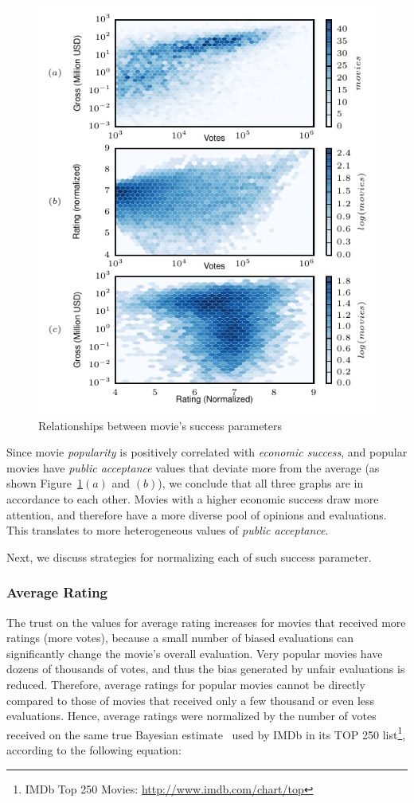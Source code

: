 \begin{figure}[tb]\begin{center} %
\includegraphics[width=0.85\columnwidth]{../../images/scatter_success_params.pdf}
\caption{\label{fig:scatter_success_params}Relationships between movie's
success parameters}
\end{center}\end{figure}

Since movie \textit{popularity} is positively correlated with \textit{economic
success}, and popular movies have \textit{public acceptance} values that
deviate more from the average (as shown
Figure~\ref{fig:scatter_success_params}$(a)$ and $(b)$), we conclude that all
three graphs are in accordance to each other. Movies with a higher economic
success draw more attention, and therefore have a more diverse pool of opinions
and evaluations. This translates to more heterogeneous values of \textit{public
acceptance}.

Next, we discuss strategies for normalizing each of such success parameter.

\subsubsection{Average Rating}
The trust on the values for average rating increases for movies that received
more ratings (more votes), because a small number of biased evaluations can
significantly change the movie's overall evaluation. Very popular movies have
dozens of thousands of votes, and thus the bias generated by unfair evaluations
is reduced. Therefore, average ratings for popular movies cannot be directly
compared to those of movies that received only a few thousand or even less
evaluations. Hence, average ratings were normalized by the number of votes
received on the same true Bayesian estimate~\cite{bolstad2013introduction} used
by IMDb in its TOP 250 list\footnote{IMDb Top 250
Movies: \url{http://www.imdb.com/chart/top}}, according to the following
equation:

